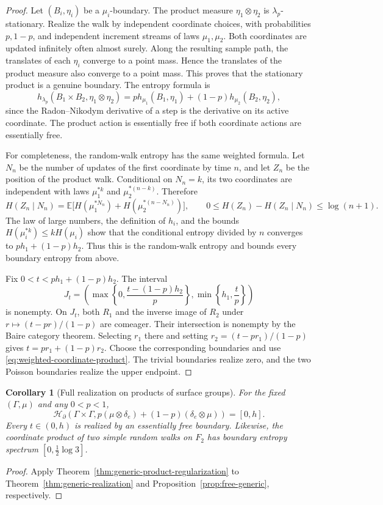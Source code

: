\documentclass[11pt,letterpaper]{amsart}
\newtheorem{corollary}[theorem]{Corollary}
\theoremstyle{definition}
\theoremstyle{remark}
\numberwithin{equation}{section}
\begin{document}
\begin{proof}
Let $(B_i,\eta_i)$ be a $\mu_i$-boundary. The product measure
$\eta_1\otimes\eta_2$ is $\lambda_p$-stationary. Realize the walk
by independent coordinate choices, with probabilities $p,1-p$,
and independent increment streams of laws $\mu_1,\mu_2$.
Both coordinates are updated infinitely often almost surely. Along
the resulting sample path, the translates of each $\eta_i$ converge
to a point mass. Hence the translates of the product measure also
converge to a point mass. This proves that the stationary product
is a genuine boundary. The entropy formula is
\begin{equation}\label{eq:weighted-coordinate-product}
 h_{\lambda_p}(B_1\times B_2,\eta_1\otimes\eta_2)
 =p h_{\mu_1}(B_1,\eta_1)+(1-p)h_{\mu_2}(B_2,\eta_2),
\end{equation}
since the Radon--Nikodym derivative of a step is the derivative on
its active coordinate. The product action is essentially free if
both coordinate actions are essentially free.

For completeness, the random-walk entropy has the same weighted
formula. Let $N_n$ be the number of updates of the first coordinate
by time $n$, and let $Z_n$ be the position of the product walk.
Conditional on $N_n=k$, its two coordinates are independent with
laws $\mu_1^{*k}$ and $\mu_2^{*(n-k)}$. Therefore
\[
 H(Z_n\mid N_n)
 =\mathbb E\bigl[H(\mu_1^{*N_n})
                  +H(\mu_2^{*(n-N_n)})\bigr],
 \qquad
 0\le H(Z_n)-H(Z_n\mid N_n)\le\log(n+1).
\]
The law of large numbers, the definition of $h_i$, and the bounds
$H(\mu_i^{*k})\le kH(\mu_i)$ show that the conditional entropy
divided by $n$ converges to $ph_1+(1-p)h_2$. Thus this is the
random-walk entropy and bounds every boundary entropy from above.

Fix $0<t<ph_1+(1-p)h_2$. The interval
\[
 J_t=\left(\max\left\{0,\frac{t-(1-p)h_2}{p}\right\},
           \min\left\{h_1,\frac{t}{p}\right\}\right)
\]
is nonempty. On $J_t$, both $R_1$ and the inverse image of $R_2$
under $r\mapsto(t-pr)/(1-p)$ are comeager. Their intersection is
nonempty by the Baire category theorem. Selecting $r_1$ there and
setting $r_2=(t-pr_1)/(1-p)$ gives
$t=pr_1+(1-p)r_2$. Choose the corresponding boundaries and use
\eqref{eq:weighted-coordinate-product}. The trivial boundaries
realize zero, and the two Poisson boundaries realize the upper
endpoint.
\end{proof}

\begin{corollary}[Full realization on products of surface groups]
\label{cor:surface-product-full}
For the fixed $(\Gamma,\mu)$ and any $0<p<1$,
\[
 \mathscr H_\partial\!\left(\Gamma\times\Gamma,
       p(\mu\otimes\delta_e)+(1-p)(\delta_e\otimes\mu)\right)
 =[0,h].
\]
Every $t\in(0,h)$ is realized by an essentially free boundary.
Likewise, the coordinate product of two simple random walks on $F_2$
has boundary entropy spectrum $[0,\frac12\log3]$.
\end{corollary}
\begin{proof}
Apply Theorem~\ref{thm:generic-product-regularization} to
Theorem~\ref{thm:generic-realization} and
Proposition~\ref{prop:free-generic}, respectively.
\end{proof}
\end{document}
